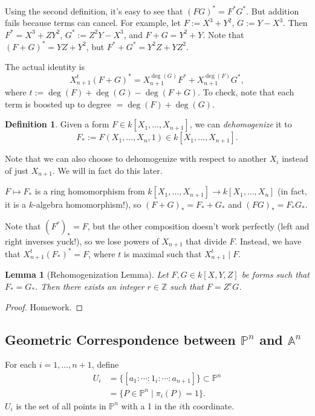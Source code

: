 \documentclass[12pt]{article}
\newcommand{\z}{\mathbb{Z}}
\newcommand{\ita}[1]{\textit{#1}}
\newtheorem{lemma}[theorem]{Lemma}
\theoremstyle{definition}
\newtheorem{definition}[theorem]{Definition}
\begin{document}
Using the second definition, it's easy to see that $(FG)^*=F^*G^*$. But addition fails because terms can cancel. For example, let $F:=X^3+Y^2$, $G:=Y-X^3$. Then $F^*=X^3+ZY^2$, $G^*:=Z^2Y-X^3$, and $F+G=Y^2+Y$. Note that $(F+G)^*=YZ+Y^2$, but $F^*+G^*=Y^2Z+YZ^2$.

The actual identity is
\begin{equation}
    X_{n+1}^t(F+G)^*=X_{n+1}^{\deg(G)}F^*+X_{n+1}^{\deg(F)}G^*,
\end{equation}
where $t:=\deg(F)+\deg(G)-\deg(F+G)$. To check, note that each term is boosted up to degree $=\deg(F)+\deg(G)$.
\begin{definition}
    Given a form $F\in k[X_1,\dotsc,X_{n+1}]$, we can \ita{dehomogenize} it to
    \begin{equation}
        F_*:=F(X_1,\dotsc,X_n,1)\in k[X_1,\dotsc,X_{n+1}].
    \end{equation}
\end{definition}
Note that we can also choose to dehomogenize with respect to another $X_i$ instead of just $X_{n+1}$. We will in fact do this later.

$F\mapsto F_*$ is a ring homomorphism from $k[X_1,\dotsc,X_{n+1}]\to k[X_1,\dotsc,X_n]$ (in fact, it is a $k$-algebra homomorphism!), so $(F+G)_*=F_*+G_*$ and $(FG)_*=F_*G_*$.

Note that $(F^*)_*=F$, but the other composition doesn't work perfectly (left and right inverses yuck!), so we lose powers of $X_{n+1}$ that divide $F$. Instead, we have that $X_{n+1}^t(F_*)^*=F$, where $t$ is maximal such that $X_{n+1}^t\mid F$.
\begin{lemma}[Rehomogenization Lemma]
    Let $F,G\in k[X,Y,Z]$ be forms such that $F_*=G_*$. Then there exists an integer $r\in\z$ such that $F=Z^rG$.
\end{lemma}
\begin{proof}
    Homework.
\end{proof}
\subsection{Geometric Correspondence between $\mathbb{P}^n$ and $\mathbb{A}^n$}
For each $i=1,\dotsc,n+1$, define
\begin{equation}
    \begin{split}
        U_i&=\{[a_1:\cdots:1_i:\cdots:a_{n+1}]\}\subset\mathbb{P}^n\\
        &=\{P\in\mathbb{P}^n\mid\pi_i(P)=1\}.
    \end{split}
\end{equation}
$U_i$ is the set of all points in $\mathbb{P}^n$ with a 1 in the $i$th coordinate. 
\end{document}
